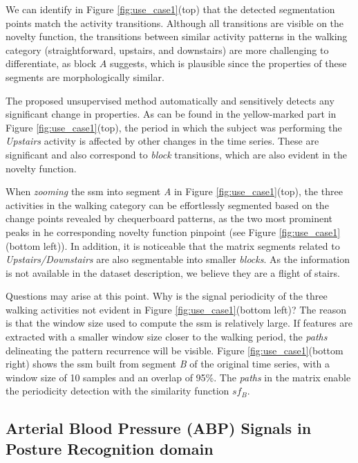We can identify in Figure \ref{fig:use_case1}(top) that the detected segmentation points match the activity transitions. Although all transitions are visible on the novelty function, the transitions between similar activity patterns in the walking category (straightforward, upstairs, and downstairs) are more challenging to differentiate, as block $A$ suggests, which is plausible since the properties of these segments are morphologically similar.

The proposed unsupervised method automatically and sensitively detects any significant change in properties. As can be found in the yellow-marked part in Figure \ref{fig:use_case1}(top), the period in which the subject was performing the \textit{Upstairs} activity is affected by other changes in the time series. These are significant and also correspond to \textit{block} transitions, which are also evident in the novelty function. 

When \textit{zooming} the \gls{ssm} into segment \textit{A} in Figure \ref{fig:use_case1}(top), the three activities in the walking category can be effortlessly segmented based on the change points revealed by chequerboard patterns, as the two most prominent peaks in he corresponding novelty function pinpoint (see Figure \ref{fig:use_case1}(bottom left)). In addition, it is noticeable that the matrix segments related to \textit{Upstairs/Downstairs} are also segmentable into smaller \textit{blocks}.
As the information is not available in the dataset description, we believe they are a flight of stairs.

Questions may arise at this point. Why is the signal periodicity of the three walking activities not evident in Figure \ref{fig:use_case1}(bottom left)? The reason is that the window size used to compute the \gls{ssm} is relatively large. If features are extracted with a smaller window size closer to the walking period, the \textit{paths} delineating the pattern recurrence will be visible. Figure \ref{fig:use_case1}(bottom right) shows the \gls{ssm} built from segment \textit{B} of the original time series, with a window size of 10 samples and an overlap of 95\%. The \textit{paths} in the matrix enable the periodicity detection with the similarity function $sf_B$.

\subsection{Arterial Blood Pressure (ABP) Signals in Posture Recognition domain}
\label{sec:abp_example}

